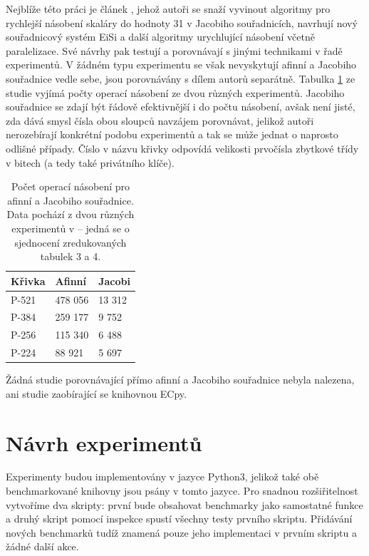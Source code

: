 \documentclass{article}
\theoremstyle{definition}
\begin{document}
Nejblíže této práci je článek \cite{eff-jacobi}, jehož autoři se snaží vyvinout algoritmy pro rychlejší násobení skaláry do hodnoty 31 v Jacobiho souřadnicích, navrhují nový souřadnicový systém EiSi a další algoritmy urychlující násobení včetně paralelizace. Své návrhy pak testují a porovnávají s jinými technikami v řadě experimentů. V žádném typu experimentu se však nevyskytují afinní a Jacobiho souřadnice vedle sebe, jsou porovnávány s dílem autorů separátně. Tabulka \ref{Tab:ejs} ze studie vyjímá počty operací násobení ze dvou různých experimentů. Jacobiho souřadnice se zdají být řádově efektivnější i do počtu násobení, avšak není jisté, zda dává smysl čísla obou sloupců navzájem porovnávat, jelikož autoři nerozebírají konkrétní podobu experimentů a tak se může jednat o naprosto odlišné případy. Číslo v názvu křivky odpovídá velikosti prvočísla zbytkové třídy v bitech (a tedy také privátního klíče).

\begin{table}[]
\centering
\begin{tabular}{|l|l|l|}
\hline
\textbf{Křivka} & \textbf{Afinní} & \textbf{Jacobi} \\ \hline \hline
P-521           & 478 056         & 13 312          \\ \hline
P-384           & 259 177         & 9 752           \\ \hline
P-256           & 115 340         & 6 488           \\ \hline
P-224           & 88 921          & 5 697           \\ \hline
\end{tabular}
\caption{Počet operací násobení pro afinní a Jacobiho souřadnice. Data pochází z dvou různých experimentů v \cite{eff-jacobi} -- jedná se o sjednocení zredukovaných tabulek 3 a 4. }
\label{Tab:ejs}
\end{table}

Žádná studie porovnávající přímo afinní a Jacobiho souřadnice nebyla nalezena, ani studie zaobírající se knihovnou ECpy.

\section{Návrh experimentů}
Experimenty budou implementovány v jazyce Python3, jelikož také obě benchmarkované knihovny jsou psány v tomto jazyce. Pro snadnou rozšiřitelnost vytvoříme dva skripty: první bude obsahovat benchmarky jako samostatné funkce a druhý skript pomocí inspekce spustí všechny testy prvního skriptu. Přidávání nových benchmarků tudíž znamená pouze jeho implementaci v prvním skriptu a žádné další akce.
\end{document}
